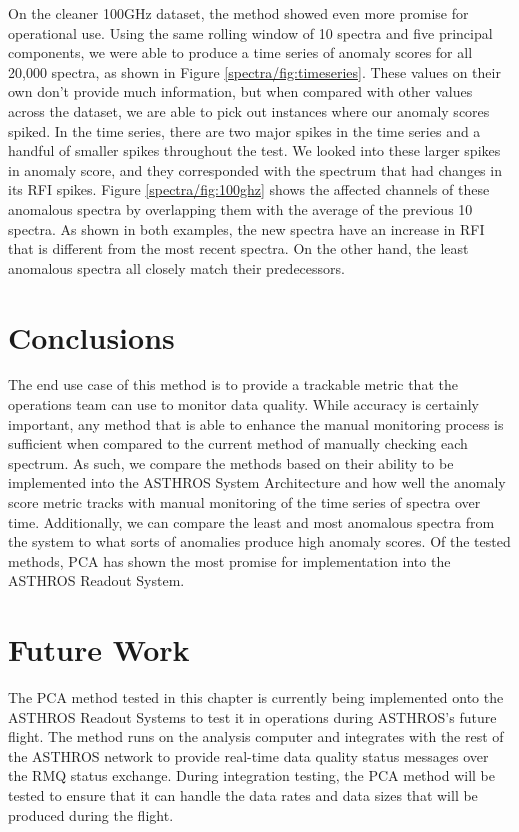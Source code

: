 On the cleaner 100GHz dataset, the method showed even more promise for operational use.
Using the same rolling window of 10 spectra and five principal components, we were able to produce a time series of anomaly scores for all 20,000 spectra, as shown in Figure \ref{spectra/fig:timeseries}.
These values on their own don't provide much information, but when compared with other values across the dataset, we are able to pick out instances where our anomaly scores spiked. 
In the time series, there are two major spikes in the time series and a handful of smaller spikes throughout the test. 
We looked into these larger spikes in anomaly score, and they corresponded with the spectrum that had changes in its RFI spikes.
Figure \ref{spectra/fig:100ghz} shows the affected channels of these anomalous spectra by overlapping them with the average of the previous 10 spectra. 
As shown in both examples, the new spectra have an increase in RFI that is different from the most recent spectra. 
On the other hand, the least anomalous spectra all closely match their predecessors.

\section{Conclusions}
\label{spectra/sec:conclusions}

The end use case of this method is to provide a trackable metric that the operations team can use to monitor data quality.
While accuracy is certainly important, any method that is able to enhance the manual monitoring process is sufficient when compared to the current method of manually checking each spectrum.
As such, we compare the methods based on their ability to be implemented into the ASTHROS System Architecture and how well the anomaly score metric tracks with manual monitoring of the time series of spectra over time.
Additionally, we can compare the least and most anomalous spectra from the system to what sorts of anomalies produce high anomaly scores.
Of the tested methods, PCA has shown the most promise for implementation into the ASTHROS Readout System.

\section{Future Work}
\label{spectra/sec:future}
The PCA method tested in this chapter is currently being implemented onto the ASTHROS Readout Systems to test it in operations during ASTHROS's future flight. 
The method runs on the analysis computer and integrates with the rest of the ASTHROS network to provide real-time data quality status messages over the RMQ status exchange.
During integration testing, the PCA method will be tested to ensure that it can handle the data rates and data sizes that will be produced during the flight. 

